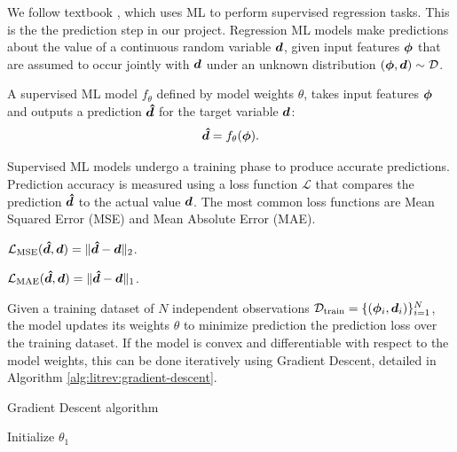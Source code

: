 We follow textbook \cite{bishopPatternRecognitionMachine2006}, which uses ML to perform supervised regression tasks. This is the the prediction step in our project. Regression ML models make predictions about the value of a continuous random variable ${\bm{d}}$, given input features ${\bm{\phi}}$ that are assumed to occur jointly with ${\bm{d}}$ under an unknown distribution $({\bm{\phi}}, {\bm{d}}) \sim \mathcal{D}$.
\begin{defin}
    \label{defin:litrev:mlmodel}
    A supervised ML model $f_\theta$ defined by model weights $\theta$, takes input features ${\bm{\phi}}$ and outputs a prediction ${\bm{\hat{d}}}$ for the target variable ${\bm{d}}$:
    $${\bm{\hat{d}}} = f_\theta({\bm{\phi}}).$$
\end{defin}

Supervised ML models undergo a training phase to produce accurate predictions. Prediction accuracy is measured using a loss function $\mathcal{L}$ that compares the prediction ${\bm{\hat{d}}}$ to the actual value ${\bm{d}}$. The most common loss functions are Mean Squared Error (MSE) and Mean Absolute Error (MAE). 
\begin{defin}
    $\mathcal{L}_{\text{MSE}}({\bm{\hat{d}}}, {\bm{d}}) = \lVert {\bm{\hat{d}}} - {\bm{d}}\rVert_2$.
\end{defin}
\begin{defin}
    $\mathcal{L}_{\text{MAE}}({\bm{\hat{d}}}, {\bm{d}}) = \lVert {\bm{\hat{d}}} - {\bm{d}}\rVert_1$.
\end{defin}
Given a training dataset of $N$ independent observations $\mathcal{D}_{\text{train}} = \{({\bm{\phi}}_i, {\bm{d}}_i)\}_{i=1}^N$, the model updates its weights $\theta$ to minimize prediction the prediction loss over the training dataset. If the model is convex and differentiable with respect to the model weights, this can be done iteratively using Gradient Descent, detailed in Algorithm \ref{alg:litrev:gradient-descent}.

\begin{algorithm}
    \caption{Gradient Descent algorithm}\label{alg:litrev:gradient-descent}
    
    
    \BlankLine
    Initialize $\theta_1$\;
    \;
\end{algorithm}

